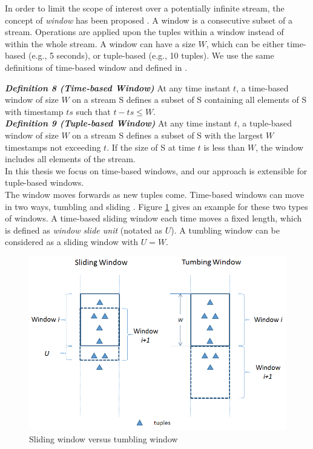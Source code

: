 \documentclass[a4paper, 11pt, twoside]{report}
\begin{document}
In order to limit the scope of interest over a potentially infinite stream, the concept of \textit{window} has been proposed \cite{abadi2005design}. A window is a consecutive subset of a stream. Operations are applied upon the tuples within a window instead of within the whole stream. A window can have a size $W$, which can be either time-based (e.g., 5 seconds), or tuple-based (e.g., 10 tuples). We use the same definitions of time-based window and  defined in \cite{ayad2004static}.\\

%

\textbf{\textit{Definition 8 (Time-based Window)}} At any time instant $t$, a time-based
window of size $W$ on a stream S defines a subset of S containing all elements of S with timestamp $ts$ such that $t-ts\leq W$.\\

\textbf{\textit{Definition 9 (Tuple-based Window)}} At any time instant $t$, a tuple-based
window of size $W$ on a stream S defines a subset of S with the largest $W$ timestamps not exceeding $t$. If the size of S at time $t$ is less than $W$, the window includes all elements of the stream.\\

In this thesis we focus on time-based windows, and our approach is extensible for tuple-based windows.\\



The window moves forwards as new tuples come. Time-based windows can move in two ways, tumbling and sliding \cite{patroumpas2006window}. Figure \ref{fig:sliding_window} gives an example for these two types of windows. A time-based sliding window each time moves a fixed length, which is defined as \textit{window slide unit} (notated as $U$). A tumbling window can be considered as a sliding window with $U=W$.\\

%

\begin{figure}[h]
\centering
\includegraphics[scale=0.6]{sliding-window}
\caption{Sliding window versus tumbling window \label{fig:sliding_window}}
\end{figure}
\end{document}
